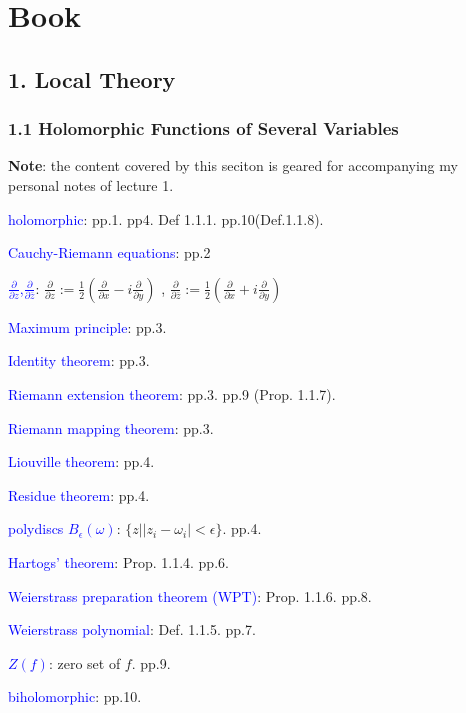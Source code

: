 
\chapter{Book}
\section{1. Local Theory}
    \subsection{1.1 Holomorphic Functions of Several Variables}
    \label{sec:1.1_book}
    \textbf{Note}: the content covered by this seciton is geared for accompanying my personal notes of lecture 1.
    
    \textcolor{blue}{holomorphic}: pp.1. pp4. Def 1.1.1. pp.10(Def.1.1.8).
    
    \textcolor{blue}{Cauchy-Riemann equations}: pp.2
    
    \textcolor{blue}{$\frac{\partial}{\partial z}$,$\frac{\partial}{\partial \bar{z}}$}:
    $\frac{\partial}{\partial z}:= \frac{1}{2}
            (\frac{\partial}{\partial x} 
            -i \frac{\partial}{\partial y})
            $
    ,
    $\frac{\partial}{\partial \bar{z}}:= \frac{1}{2}
    (\frac{\partial}{\partial x} 
    + i \frac{\partial}{\partial y})
    $
    
    
    \textcolor{blue}{Maximum principle}: pp.3.
    
    \textcolor{blue}{Identity theorem}: pp.3.
    
    \textcolor{blue}{Riemann extension theorem}: pp.3. pp.9 (Prop. 1.1.7).
    
    \textcolor{blue}{Riemann mapping theorem}: pp.3.
    
    \textcolor{blue}{Liouville theorem}: pp.4.
    
    \textcolor{blue}{Residue theorem}: pp.4.
    
    \textcolor{blue}{polydiscs $B_\epsilon(\omega)$}: $\{z| |z_i-\omega_i| <\epsilon\} $.  pp.4.
    
    \textcolor{blue}{Hartogs' theorem}: Prop. 1.1.4. pp.6.
    
    \textcolor{blue}{Weierstrass preparation theorem (WPT)}:
    Prop. 1.1.6. pp.8.
    
    \textcolor{blue}{Weierstrass polynomial}: Def. 1.1.5. pp.7.
    
    \textcolor{blue}{$Z(f)$}: zero set of $f$. pp.9.
    
    \textcolor{blue}{biholomorphic}: pp.10.
    
